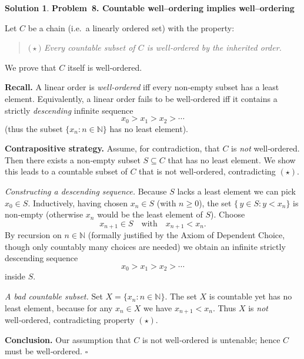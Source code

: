 \documentclass[12pt]{article}
\theoremstyle{definition} %
\newtheorem{solution}{Solution}
\theoremstyle{plain} %
\begin{document}
\begin{solution}
  \textbf{Problem 8.  Countable well–ordering implies well–ordering}
  
  Let \(C\) be a chain (i.e.\ a linearly ordered set) with the property:
  
  \begin{quote}
  \(\bigl(\star\bigr)\) \emph{Every countable subset of \(C\) is well‑ordered
  by the inherited order.}
  \end{quote}
  
  We prove that \(C\) itself is well‑ordered.
  
  \medskip
  \textbf{Recall.}
  A linear order is \emph{well‑ordered} iff every non‑empty subset has a
  least element.  Equivalently, a linear order fails to be well‑ordered
  iff it contains a strictly \emph{descending} infinite sequence
  \[
     x_0 > x_1 > x_2 > \dotsb
  \]
  (thus the subset \(\{x_n:n\in\mathbb N\}\) has no least element).
  
  \medskip
  \textbf{Contrapositive strategy.}
  Assume, for contradiction, that \(C\) is \emph{not} well‑ordered.
  Then there exists a non‑empty subset \(S\subseteq C\) that has no least
  element.  We show this leads to a countable subset of \(C\) that is
  not well‑ordered, contradicting \((\star)\).
  
  \smallskip
  \emph{Constructing a descending sequence.}
  Because \(S\) lacks a least element we can pick \(x_0\in S\).
  Inductively, having chosen \(x_n\in S\) (with \(n\ge 0\)), the set
  \(\{\,y\in S: y<x_n\}\) is non‑empty (otherwise \(x_n\) would be the
  least element of \(S\)).  Choose
  \[
     x_{n+1}\in S
     \quad\text{with}\quad
     x_{n+1}<x_n.
  \]
  By recursion on \(n\in\mathbb N\) (formally justified by the Axiom of
  Dependent Choice, though only countably many choices are needed) we
  obtain an infinite strictly descending sequence
  \[
     x_0 > x_1 > x_2 > \dotsb
  \]
  inside \(S\).
  
  \smallskip
  \emph{A bad countable subset.}
  Set \(X=\{x_n:n\in\mathbb N\}\).
  The set \(X\) is countable yet has no least element, because for any
  \(x_n\in X\) we have \(x_{n+1}<x_n\).
  Thus \(X\) is \emph{not} well‑ordered, contradicting property
  \((\star)\).
  
  \medskip
  \textbf{Conclusion.}
  Our assumption that \(C\) is not well‑ordered is untenable; hence
  \(C\) must be well‑ordered.
  \(\square\)
  \end{solution}
  
\end{document}
